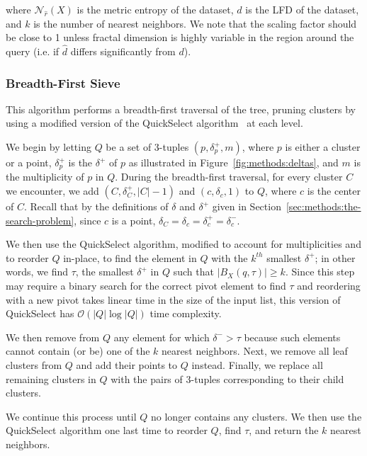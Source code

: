 where $\mathcal{N}_{\hat{r}}(X)$ is the metric entropy of the dataset, $d$ is the LFD of the dataset, and $k$ is the number of nearest neighbors.
We note that the scaling factor should be close to 1 unless fractal dimension is highly variable in the region around the query (i.e. if $\hat{d}$ differs significantly from $d$).


\subsubsection{Breadth-First Sieve}
\label{sec:methods:knn-search:bredth-first-sieve}

This algorithm performs a breadth-first traversal of the tree, pruning clusters by using a modified version of the QuickSelect algorithm~\cite{hoare1961algorithm} at each level.

We begin by letting $Q$ be a set of 3-tuples $(p, \delta^{+}_{p}, m)$, where $p$ is either a cluster or a point, $\delta^{+}_{p}$ is the $\delta^{+}$ of $p$ as illustrated in Figure~\ref{fig:methods:deltas}, and $m$ is the multiplicity of $p$ in $Q$.
During the breadth-first traversal, for every cluster $C$ we encounter, we add $(C, \delta^{+}_{C}, |C| - 1)$ and $(c, \delta_{c}, 1)$ to $Q$, where $c$ is the center of $C$.
Recall that by the definitions of $\delta$ and $\delta^{+}$ given in Section~\ref{sec:methods:the-search-problem}, since $c$ is a point, $\delta_{C} = \delta_{c} = \delta^{+}_{c} = \delta^{-}_{c}$.

We then use the QuickSelect algorithm, modified to account for multiplicities and to reorder $Q$ in-place, to find the element in $Q$ with the $k^{th}$ smallest $\delta^{+}$; in other words, we find $\tau$, the smallest $\delta^{+}$ in $Q$ such that $\left| B_X(q, \tau) \right| \geq k$.
Since this step may require a binary search for the correct pivot element to find $\tau$ and reordering with a new pivot takes linear time in the size of the input list, this version of QuickSelect has $\mathcal{O}(|Q| \log |Q|)$ time complexity.

We then remove from $Q$ any element for which $\delta^{-} > \tau$ because such elements cannot contain (or be) one of the $k$ nearest neighbors.
Next, we remove all leaf clusters from $Q$ and add their points to $Q$ instead.
Finally, we replace all remaining clusters in $Q$ with the pairs of 3-tuples corresponding to their child clusters.

We continue this process until $Q$ no longer contains any clusters.
We then use the QuickSelect algorithm one last time to reorder $Q$, find $\tau$, and return the $k$ nearest neighbors.

